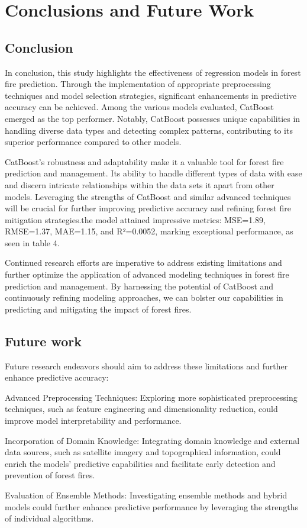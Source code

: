 \chapter{Conclusions and Future Work}
\label{ch:con}
\section{Conclusion}

In conclusion, this study highlights the effectiveness of regression models in forest fire prediction. Through the implementation of appropriate preprocessing techniques and model selection strategies, significant enhancements in predictive accuracy can be achieved. Among the various models evaluated, CatBoost emerged as the top performer. Notably, CatBoost possesses unique capabilities in handling diverse data types and detecting complex patterns, contributing to its superior performance compared to other models.

CatBoost's robustness and adaptability make it a valuable tool for forest fire prediction and management. Its ability to handle different types of data with ease and discern intricate relationships within the data sets it apart from other models. Leveraging the strengths of CatBoost and similar advanced techniques will be crucial for further improving predictive accuracy and refining forest fire mitigation strategies.the model attained impressive metrics: MSE=1.89, RMSE=1.37, MAE=1.15, and R²=0.0052, marking exceptional performance, as seen in table 4.

Continued research efforts are imperative to address existing limitations and further optimize the application of advanced modeling techniques in forest fire prediction and management. By harnessing the potential of CatBoost and continuously refining modeling approaches, we can bolster our capabilities in predicting and mitigating the impact of forest fires.

\section{Future work}
Future research endeavors should aim to address these limitations and further enhance predictive accuracy:

Advanced Preprocessing Techniques: Exploring more sophisticated preprocessing techniques, such as feature engineering and dimensionality reduction, could improve model interpretability and performance.

Incorporation of Domain Knowledge: Integrating domain knowledge and external data sources, such as satellite imagery and topographical information, could enrich the models' predictive capabilities and facilitate early detection and prevention of forest fires.

Evaluation of Ensemble Methods: Investigating ensemble methods and hybrid models could further enhance predictive performance by leveraging the strengths of individual algorithms.
